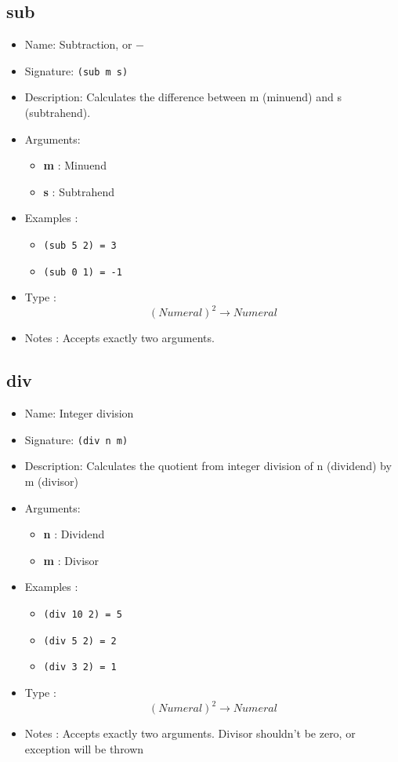 \subsection{sub}
\begin{itemize}
    \item Name: Subtraction, or $-$
    \item Signature: \texttt{(sub m s)}
    \item Description: Calculates the difference between m (minuend) and s (subtrahend).
    \item Arguments:
        \begin{itemize}
            \item \textbf{m} : Minuend
            \item \textbf{s} : Subtrahend
        \end{itemize}
    \item Examples :
        \begin{itemize}
            \item \texttt{(sub 5 2) = 3}
            \item \texttt{(sub 0 1) = -1}
        \end{itemize}
    \item Type : \[(Numeral)^2 \to Numeral\]
    \item Notes : Accepts exactly two arguments.
\end{itemize}

\subsection{div}
\begin{itemize}
    \item Name: Integer division
    \item Signature: \texttt{(div n m)}
    \item Description: Calculates the quotient from integer division of n (dividend) by m (divisor)
    \item Arguments:
        \begin{itemize}
            \item \textbf{n} : Dividend
            \item \textbf{m} : Divisor
        \end{itemize}
    \item Examples :
        \begin{itemize}
            \item \texttt{(div 10 2) = 5}
            \item \texttt{(div 5 2) = 2}
            \item \texttt{(div 3 2) = 1}
        \end{itemize}
    \item Type : \[(Numeral)^2 \to Numeral\]
    \item Notes : Accepts exactly two arguments. Divisor shouldn't be zero, or exception will be thrown
\end{itemize}

